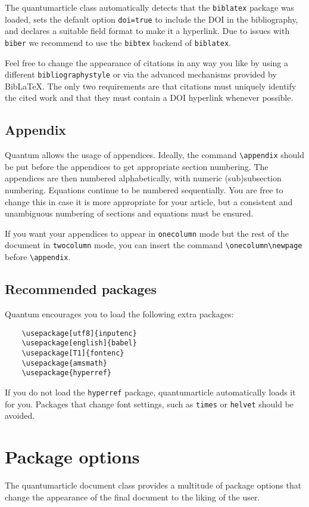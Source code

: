 \documentclass[a4paper,noarxiv,onecolumn]{quantumarticle}
\begin{document}
	The quantumarticle class automatically detects that the \texttt{biblatex} package was loaded, sets the default option \texttt{doi=true} to include the DOI in the bibliography, and declares a suitable field format to make it a hyperlink.
	Due to issues with \texttt{biber} we recommend to use the \texttt{bibtex} backend of \texttt{biblatex}.
	
	Feel free to change the appearance of citations in any way you like by using a different \texttt{bibliographystyle} or via the advanced mechanisms provided by BibLaTeX.
	The only two requirements are that citations must uniquely identify the cited work and that they must contain a DOI hyperlink whenever possible.
	
	\subsection{Appendix}
	Quantum allows the usage of appendices. Ideally, the command \texttt{\textbackslash{}appendix} should be put before the appendices to get appropriate section numbering. The appendices are then numbered alphabetically, with numeric (sub)subsection numbering.
	Equations continue to be numbered sequentially.
	You are free to change this in case it is more appropriate for your article, but a consistent and unambiguous numbering of sections and equations must be ensured.
	
	If you want your appendices to appear in \texttt{onecolumn} mode but the rest of the document in \texttt{twocolumn} mode, you can insert the command \texttt{\textbackslash{}onecolumn\textbackslash{}newpage} before \texttt{\textbackslash{}appendix}.   
	
	\subsection{Recommended packages}
	Quantum encourages you to load the following extra packages:
	\begin{verbatim}
	\usepackage[utf8]{inputenc}
	\usepackage[english]{babel}
	\usepackage[T1]{fontenc}
	\usepackage{amsmath}
	\usepackage{hyperref}
	\end{verbatim}
	If you do not load the \texttt{hyperref} package, quantumarticle automatically loads it for you.
	Packages that change font settings, such as \texttt{times} or \texttt{helvet} should be avoided.
	
	\section{Package options}
	The quantumarticle document class provides a multitude of package options that change the appearance of the final document to the liking of the user. 
	
\end{document}
